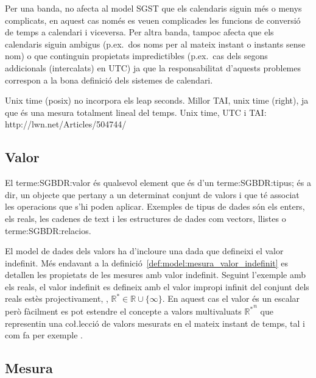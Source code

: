 Per una banda, no afecta al model SGST que els calendaris siguin més o
menys complicats, en aquest cas només es veuen complicades les
funcions de conversió de temps a calendari i viceversa.  Per altra
banda, tampoc afecta que els calendaris siguin ambigus (p.ex.\ dos
noms per al mateix instant o instants sense nom) o que continguin
propietats impredictibles (p.ex.\ cas dels segons addicionals
(intercalats) en UTC) ja que la responsabilitat d'aquests problemes
correspon a la bona definició dels sistemes de calendari.


Unix time (posix) no incorpora els leap seconds.
Millor TAI, unix time (right), ja que és una mesura totalment lineal del temps. 
Unix time, UTC i TAI: http://lwn.net/Articles/504744/


\subsection{Valor}

El \gls{terme:SGBDR:valor} és qualsevol element que és d'un
\gls{terme:SGBDR:tipus}; és a dir, un objecte que
pertany a un determinat conjunt de valors i que té associat les
operacions que s'hi poden aplicar. Exemples de tipus de dades són els
enters, els reals, les cadenes de text i les estructures de dades com
vectors, llistes o \glspl{terme:SGBDR:relacio}.  

El model de dades dels valors ha d'incloure una dada que defineixi el
valor indefinit. Més endavant a la
definició~\ref{def:model:mesura_valor_indefinit} es detallen les
propietats de les mesures amb valor indefinit. Seguint l'exemple amb
els reals, el valor indefinit es defineix amb el valor impropi infinit
del conjunt dels reals estès
projectivament, \parencite{cantrell:projectivelyextendedreal},
$\mathbb{R}^*\in\mathbb{R} \cup \{\infty\}$.  En aquest cas el valor
és un escalar però fàcilment es pot estendre el concepte a valors
multivaluats ${\mathbb{R}^*}^n$ que representin una co\l.lecció de
valors mesurats en el mateix instant de temps, tal i com fa per
exemple \textcite{assfalg08:thesis}.





\subsection{Mesura}\label{sec:model:mesura} 

